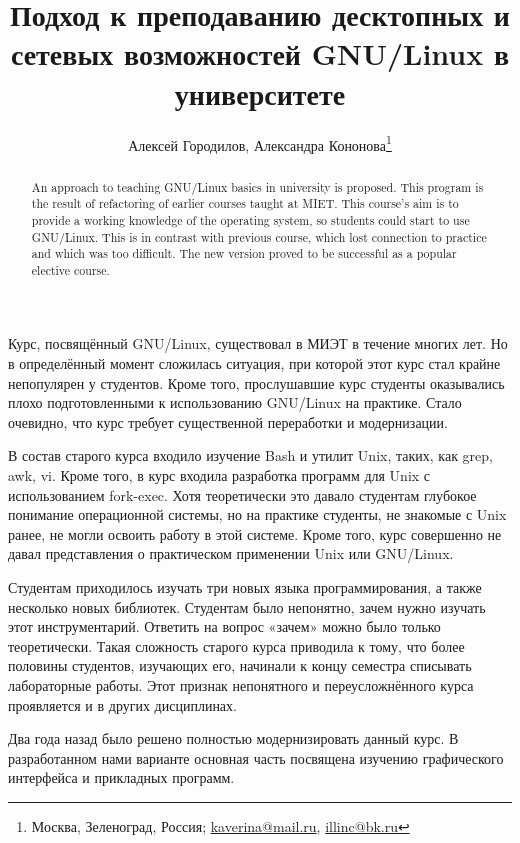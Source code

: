 \documentclass[10pt, a5paper]{article}
\begin{document}
\title{Подход к преподаванию десктопных и сетевых возможностей GNU/Linux в университете}%

\author{Алексей Городилов, Александра Кононова\footnote{Москва, Зеленоград, Россия; \url{kaverina@mail.ru}, \url{illinc@bk.ru}}}
\maketitle

\begin{abstract}
An approach to teaching GNU/Linux basics in university is proposed. This program is the result of refactoring of earlier courses taught at MIET. This course's aim is to provide a working knowledge of the operating system, so students could start to use GNU/Linux. This is in contrast with previous course, which lost connection to practice and which was too difficult. The new version proved to be successful as a popular elective course.
\end{abstract}
Курс, посвящённый GNU/Linux, существовал в МИЭТ в течение многих лет. Но в определённый момент сложилась ситуация, при которой этот курс стал крайне непопулярен у студентов. Кроме того, прослушавшие курс студенты оказывались плохо подготовленными к использованию GNU/Linux на практике. Стало очевидно, что курс требует существенной переработки и модернизации.

В состав старого курса входило изучение Bash и утилит Unix, таких, как grep, awk, vi. Кроме того, в курс входила разработка программ для Unix с использованием fork-exec.
Хотя теоретически это давало студентам глубокое понимание операционной системы, но на практике студенты, не знакомые с Unix ранее, не могли освоить работу в этой системе. Кроме того, курс совершенно не давал представления о практическом применении Unix или GNU/Linux.

Студентам приходилось изучать три новых языка программирования, а также несколько новых библиотек.  Студентам было непонятно, зачем нужно изучать этот инструментарий. Ответить на вопрос «зачем» можно было только теоретически. Такая сложность  старого курса приводила к тому, что более половины студентов, изучающих его, начинали к концу семестра списывать лабораторные работы. Этот признак непонятного и переусложнённого курса проявляется и в других дисциплинах.

Два года назад было решено полностью модернизировать данный курс. В разработанном нами варианте основная часть  посвящена изучению графического интерфейса и прикладных программ.
\end{document}
